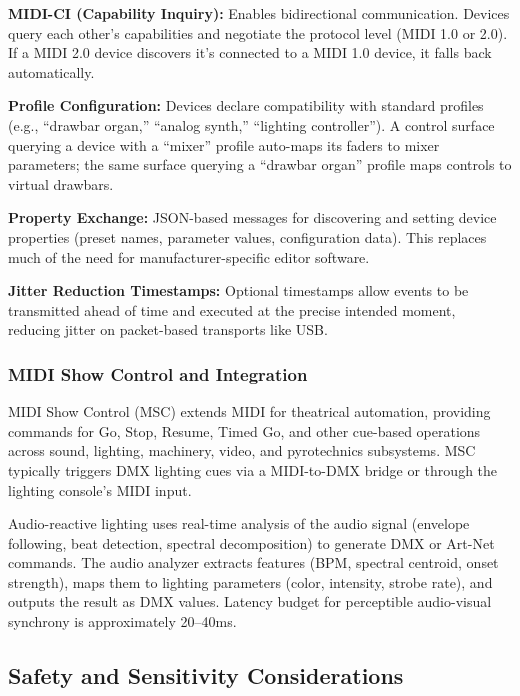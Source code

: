 \documentclass[11pt,letterpaper]{article}
\begin{document}
\textbf{MIDI-CI (Capability Inquiry):} Enables bidirectional communication. Devices query each other's capabilities and negotiate the protocol level (MIDI 1.0 or 2.0). If a MIDI 2.0 device discovers it's connected to a MIDI 1.0 device, it falls back automatically.

\textbf{Profile Configuration:} Devices declare compatibility with standard profiles (e.g., ``drawbar organ,'' ``analog synth,'' ``lighting controller''). A control surface querying a device with a ``mixer'' profile auto-maps its faders to mixer parameters; the same surface querying a ``drawbar organ'' profile maps controls to virtual drawbars.

\textbf{Property Exchange:} JSON-based messages for discovering and setting device properties (preset names, parameter values, configuration data). This replaces much of the need for manufacturer-specific editor software.

\textbf{Jitter Reduction Timestamps:} Optional timestamps allow events to be transmitted ahead of time and executed at the precise intended moment, reducing jitter on packet-based transports like USB.

\subsubsection{MIDI Show Control and Integration}

MIDI Show Control (MSC) extends MIDI for theatrical automation, providing commands for Go, Stop, Resume, Timed Go, and other cue-based operations across sound, lighting, machinery, video, and pyrotechnics subsystems. MSC typically triggers DMX lighting cues via a MIDI-to-DMX bridge or through the lighting console's MIDI input.

Audio-reactive lighting uses real-time analysis of the audio signal (envelope following, beat detection, spectral decomposition) to generate DMX or Art-Net commands. The audio analyzer extracts features (BPM, spectral centroid, onset strength), maps them to lighting parameters (color, intensity, strobe rate), and outputs the result as DMX values. Latency budget for perceptible audio-visual synchrony is approximately 20--40ms.

\subsection{Safety and Sensitivity Considerations}
\end{document}
